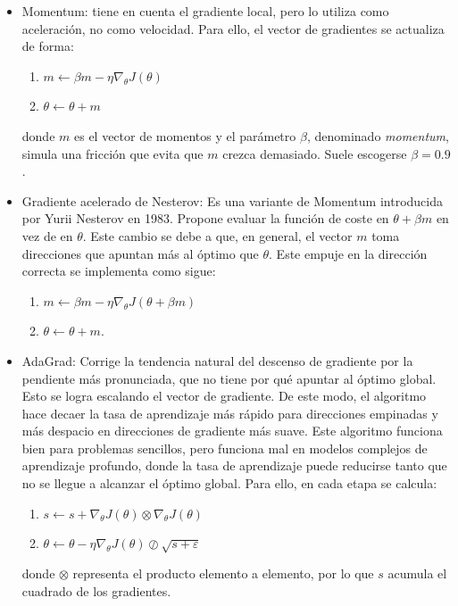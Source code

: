 \begin{itemize}
    \item Momentum: tiene en cuenta el gradiente local, pero lo utiliza como aceleración, no como velocidad. Para ello, el vector de gradientes se actualiza de forma: 
    \begin{enumerate}
        \item $m \leftarrow \beta m - \eta \nabla_\theta J(\theta) $
        \item $\theta \leftarrow \theta + m$ 
    \end{enumerate}
    donde $m$ es el vector de momentos y el parámetro $\beta$, denominado \textit{momentum}, simula una fricción que evita que $m$ crezca demasiado. Suele escogerse $\beta = 0.9$. 

    \item Gradiente acelerado de Nesterov: Es una variante de Momentum introducida por Yurii Nesterov en 1983. Propone evaluar la función de coste en $\theta+ \beta m$ en vez de en $\theta$. Este cambio se debe a que, en general, el vector $m$ toma direcciones que apuntan más al óptimo que $\theta$. Este empuje en la dirección correcta se implementa como sigue:
    \begin{enumerate}
        \item $m \leftarrow \beta m - \eta \nabla_\theta J(\theta + \beta m) $
        \item $\theta \leftarrow \theta + m$. 
    \end{enumerate}

    \item AdaGrad: Corrige la tendencia natural del descenso de gradiente por la pendiente más pronunciada, que no tiene por qué apuntar al óptimo global. Esto se logra escalando el vector de gradiente. De este modo, el algoritmo hace decaer la tasa de aprendizaje más rápido para direcciones empinadas y más despacio en direcciones de gradiente más suave. Este algoritmo funciona bien para problemas sencillos, pero funciona mal en modelos complejos de aprendizaje profundo, donde la tasa de aprendizaje puede reducirse tanto que no se llegue a alcanzar el óptimo global. Para ello, en cada etapa se calcula:
    \begin{enumerate}
        \item $s \leftarrow s +  \nabla_\theta J(\theta)\otimes \nabla_\theta J(\theta) $
        \item $\theta \leftarrow \theta -\eta \nabla_\theta J(\theta)\oslash\sqrt{s+\varepsilon}$
    \end{enumerate}
    donde $\otimes$ representa el producto elemento a elemento, por lo que $s$ acumula el cuadrado de los gradientes. 
    


\end{itemize}
